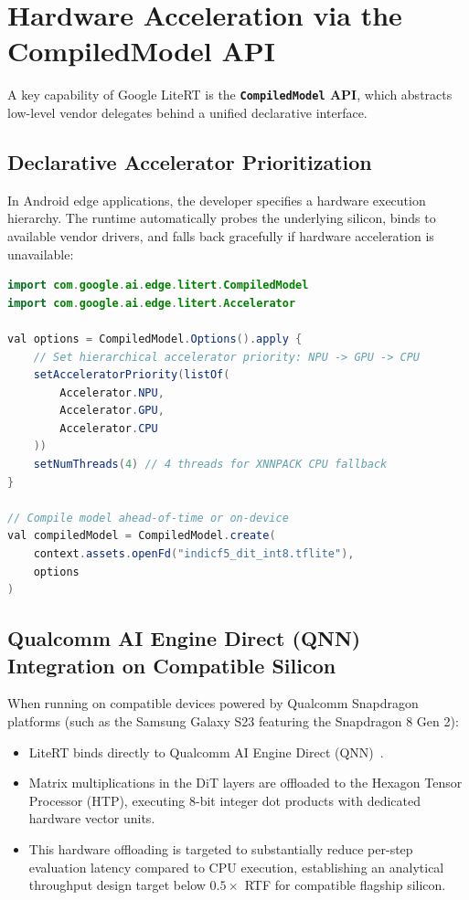 \section{Hardware Acceleration via the CompiledModel API}
A key capability of Google LiteRT is the \textbf{\texttt{CompiledModel} API}, which abstracts low-level vendor delegates behind a unified declarative interface.

\subsection{Declarative Accelerator Prioritization}
In Android edge applications, the developer specifies a hardware execution hierarchy. The runtime automatically probes the underlying silicon, binds to available vendor drivers, and falls back gracefully if hardware acceleration is unavailable:

\begin{lstlisting}[language=Java,caption={Kotlin/Android CompiledModel Initialization with Accelerator Priority}]
import com.google.ai.edge.litert.CompiledModel
import com.google.ai.edge.litert.Accelerator

val options = CompiledModel.Options().apply {
    // Set hierarchical accelerator priority: NPU -> GPU -> CPU
    setAcceleratorPriority(listOf(
        Accelerator.NPU,
        Accelerator.GPU,
        Accelerator.CPU
    ))
    setNumThreads(4) // 4 threads for XNNPACK CPU fallback
}

// Compile model ahead-of-time or on-device
val compiledModel = CompiledModel.create(
    context.assets.openFd("indicf5_dit_int8.tflite"),
    options
)
\end{lstlisting}

\subsection{Qualcomm AI Engine Direct (QNN) Integration on Compatible Silicon}
When running on compatible devices powered by Qualcomm Snapdragon platforms (such as the Samsung Galaxy S23 featuring the Snapdragon 8 Gen 2):
\begin{itemize}
    \item LiteRT binds directly to Qualcomm AI Engine Direct (QNN)~\cite{qualcomm_qnn2024}.
    \item Matrix multiplications in the DiT layers are offloaded to the Hexagon Tensor Processor (HTP), executing 8-bit integer dot products with dedicated hardware vector units.
    \item This hardware offloading is targeted to substantially reduce per-step evaluation latency compared to CPU execution, establishing an analytical throughput design target below $0.5\times$ RTF for compatible flagship silicon.
\end{itemize}

